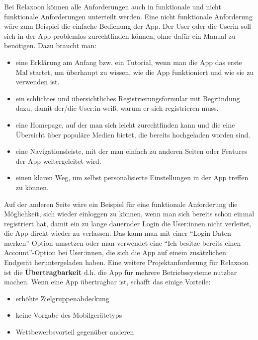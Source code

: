 Bei Relaxoon können alle Anforderungen auch in funktionale und nicht funktionale Anforderungen unterteilt werden.
Eine nicht funktionale Anforderung wäre zum Beispiel die einfache Bedienung der App. Der User oder die Userin
soll sich in der App problemlos zurechtfinden können, ohne dafür ein Manual zu benötigen. Dazu braucht man:
\begin{itemize}
      \item eine Erklärung am Anfang bzw. ein Tutorial, wenn man die App das erste Mal startet, um überhaupt 
      zu wissen, wie die App funktioniert und wie sie zu verwenden ist.
      \item ein schlichtes und übersichtliches Registrierungsformular mit Begründung dazu, damit der/die User:in
      weiß, warum er sich registrieren muss.
      \item eine Homepage, auf der man sich leicht zurechtfinden kann und die eine Übersicht über populäre Medien bietet, 
      die bereits hochgeladen worden sind.
      \item eine Navigationsleiste, mit der man einfach zu anderen Seiten oder Features der App weitergeleitet wird.
      \item einen klaren Weg, um selbst personalisierte Einstellungen in der App treffen zu können. 
\end{itemize}

Auf der anderen Seite wäre ein Beispiel für eine funktionale Anforderung die Möglichkeit, sich wieder einloggen zu
können, wenn man sich bereits schon einmal registriert hat, damit ein zu lange dauernder Login die User:innen
nicht verleitet, die App direkt wieder zu verlassen. Das kann man mit einer "`Login Daten merken"'-Option umsetzen
oder man verwendet eine "`Ich besitze bereits einen Account"'-Option bei User:innen, die sich die App auf einem
zusätzlichen Endgerät heruntergeladen haben. Eine weitere Projektanforderung für Relaxoon ist die
\textbf{Übertragbarkeit} d.h. die App für mehrere Betriebssysteme nutzbar machen. Wenn eine App übertragbar ist,
schafft das einige Vorteile:
\begin{itemize}
      \item erhöhte Zielgruppenabdeckung
      \item keine Vorgabe des Mobilgerätetyps
      \item Wettbewerbsvorteil gegenüber anderen
\end{itemize}